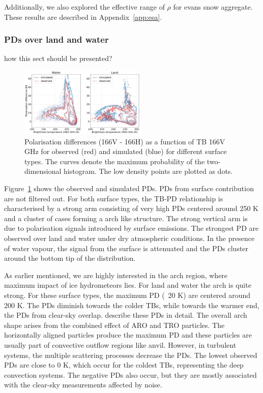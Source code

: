 \documentclass[amt, manuscript]{copernicus}
\newcommand{\todo}[1]{{\color{red} #1}}
\begin{document}
Additionally, we also explored the effective range of $\rho$ for evans snow aggregate. These results are described in Appendix~\ref{app:esa}. 


\subsubsection{PDs over land and water}
%
\todo{how this sect should be presented?}
\label{sec:PD}
\begin{figure}[t]
	\includegraphics[width=6cm]{Figures/hist2d_land_water_jan.pdf}
	\caption{Polarisation differences (166V - 166H) as a function of
		TB 166V GHz for observed (red) and simulated (blue) for
		different surface types. The curves denote the maximum probability of the two-dimensional histogram. The low density points are plotted as dots. }
	\label{fig:PD_water_land}
\end{figure}

Figure~\ref{fig:PD_water_land} shows the observed and simulated PDs. PDs from surface contribution are not filtered out. For both surface types, the TB-PD relationship is characterised by a strong arm consisting of very high PDs centered around 250\,\,K and a cluster of cases forming a arch like structure. The strong vertical arm is due to polarisation signals introduced by surface emissions. The strongest PD are observed over land and water under dry atmospheric conditions. In the presence of water vapour, the signal from the surface is attenuated and the PDs cluster around the bottom tip of the distribution. 

As earlier mentioned, we are highly interested in the arch region, where maximum impact of ice hydrometeors lies. For land and water the arch is quite strong. For these surface types, the maximum PD (~20\,\,K) are centered around 200\,\,K. The PDs diminish towards the colder TBs, while towards the warmer end, the PDs from clear-sky overlap. \citet{gong:micro:17, galligani:param:21} describe these PDs in detail. The overall arch shape arises from the combined effect of ARO and TRO particles. The horizontally aligned particles produce the maximum PD and these particles are usually part of convective outflow regions like anvil. However, in turbulent systems, the multiple scattering processes decrease the PDs. The lowest observed PDs are close to 0\,\,K, which occur for the coldest TBs, representing the deep convection systems. The negative PDs also occur, but they are mostly associated with the clear-sky measurements affected by noise. 
\end{document}
